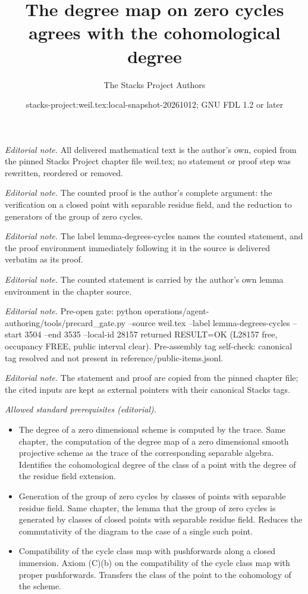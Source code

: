 \documentclass[10pt,a4paper]{amsart}
\title{The degree map on zero cycles agrees with the cohomological degree}
\author{The Stacks Project Authors}
\date{stacks-project:weil.tex:local-snapshot-20261012; GNU FDL 1.2 or later}
\theoremstyle{plain}
\theoremstyle{definition}
\theoremstyle{remark}
\numberwithin{equation}{subsection}
\begin{document}
\maketitle
\noindent\textit{Editorial note.} All delivered mathematical text is the author's own, copied from the pinned Stacks Project chapter file weil.tex; no statement or proof step was rewritten, reordered or removed.\par\medskip
\noindent\textit{Editorial note.} The counted proof is the author's complete argument: the verification on a closed point with separable residue field, and the reduction to generators of the group of zero cycles.\par\medskip
\noindent\textit{Editorial note.} The label lemma-degrees-cycles names the counted statement, and the proof environment immediately following it in the source is delivered verbatim as its proof.\par\medskip
\noindent\textit{Editorial note.} The counted statement is carried by the author's own lemma environment in the chapter source.\par\medskip
\noindent\textit{Editorial note.} Pre-open gate: python operations/agent-authoring/tools/precard\_gate.py --source weil.tex --label lemma-degrees-cycles --start 3504 --end 3535 --local-id 28157 returned RESULT=OK (L28157 free, occupancy FREE, public interval clear). Pre-assembly tag self-check: canonical tag resolved and not present in reference/public-items.jsonl.\par\medskip
\noindent\textit{Editorial note.} The statement and proof are copied from the pinned chapter file; the cited inputs are kept as external pointers with their canonical Stacks tags.\par\medskip
\noindent\textit{Allowed standard prerequisites (editorial).}\begin{itemize}
\item The degree of a zero dimensional scheme is computed by the trace. Same chapter, the computation of the degree map of a zero dimensional smooth projective scheme as the trace of the corresponding separable algebra. Identifies the cohomological degree of the class of a point with the degree of the residue field extension.
\item Generation of the group of zero cycles by classes of points with separable residue field. Same chapter, the lemma that the group of zero cycles is generated by classes of closed points with separable residue field. Reduces the commutativity of the diagram to the case of a single such point.
\item Compatibility of the cycle class map with pushforwards along a closed immersion. Axiom (C)(b) on the compatibility of the cycle class map with proper pushforwards. Transfers the class of the point to the cohomology of the scheme.
\end{itemize}\medskip
\end{document}
